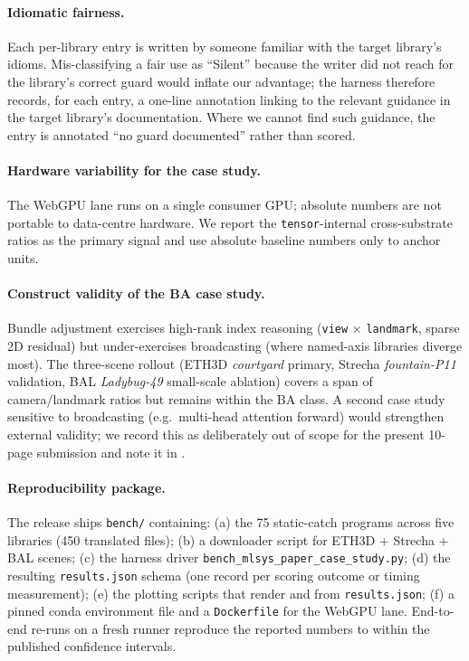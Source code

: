 \documentclass[10pt,twocolumn]{article}
\newcommand{\code}[1]{\texttt{#1}}
\begin{document}
\paragraph{Idiomatic fairness.}
Each per-library entry is written by someone familiar with the
target library's idioms. Mis-classifying a fair use as
``Silent'' because the writer did not reach for the library's
correct guard would inflate our advantage; the harness therefore
records, for each entry, a one-line annotation linking to the
relevant guidance in the target library's documentation. Where we
cannot find such guidance, the entry is annotated ``no guard
documented'' rather than scored.

\paragraph{Hardware variability for the case study.}
The WebGPU lane runs on a single consumer GPU; absolute numbers are
not portable to data-centre hardware. We report the
\code{tensor}-internal cross-substrate ratios as the primary signal
and use absolute baseline numbers only to anchor units.

\paragraph{Construct validity of the BA case study.}
Bundle adjustment exercises high-rank index reasoning
(\code{view} $\times$ \code{landmark}, sparse 2D residual) but
under-exercises broadcasting (where named-axis libraries diverge
most). The three-scene rollout (ETH3D \emph{courtyard} primary,
Strecha \emph{fountain-P11} validation, BAL \emph{Ladybug-49}
small-scale ablation) covers a span of camera/landmark ratios but
remains within the BA class. A second case study sensitive to
broadcasting (e.g.\ multi-head attention forward) would strengthen
external validity; we record this as deliberately out of scope for
the present 10-page submission and note it in .

\paragraph{Reproducibility package.}
The release ships
\code{bench/} containing: (a) the 75 static-catch programs across
five libraries (450 translated files); (b) a downloader script for
ETH3D + Strecha + BAL scenes; (c) the harness driver
\code{bench\_mlsys\_paper\_case\_study.py}; (d) the resulting
\code{results.json} schema (one record per scoring outcome or
timing measurement); (e) the plotting scripts that render
 and  from
\code{results.json}; (f) a pinned conda environment file and a
\code{Dockerfile} for the WebGPU lane. End-to-end re-runs on a
fresh runner reproduce the reported numbers to within the published
confidence intervals.
\end{document}

